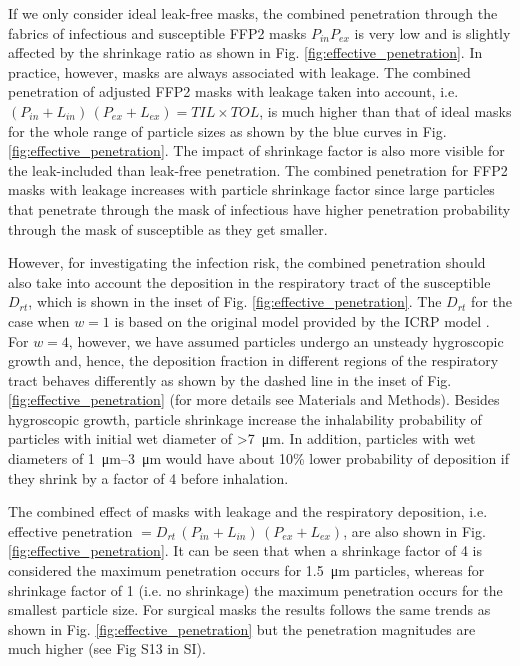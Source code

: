 \documentclass[preprint]{elsarticle}
\begin{document}
If we only consider ideal leak-free masks, the combined penetration through the fabrics of infectious and susceptible FFP2 masks $P_{in} P_{ex}$ is very low and is slightly affected by the shrinkage ratio as shown in Fig. \ref{fig:effective_penetration}. 
In practice, however, masks are always associated with leakage. 
The combined penetration of adjusted FFP2 masks with leakage taken into account, i.e. $\left(P_{in}+L_{in}\right)\,\left(P_{ex}+L_{ex}\right) = TIL\times TOL$, is much higher than that of ideal masks for the whole range of particle sizes as shown by the blue curves in Fig. \ref{fig:effective_penetration}.
The impact of shrinkage factor is also more visible for the leak-included than leak-free penetration.
The combined penetration for FFP2 masks with leakage increases with particle shrinkage factor since large particles that penetrate through the mask of infectious have higher penetration probability through the mask of susceptible as they get smaller. 


However, for investigating the infection risk, the combined penetration should also take into account the deposition in the respiratory tract of the susceptible $D_{rt}$, which is shown in the inset of Fig. \ref{fig:effective_penetration}.
The $D_{rt}$ for the case when $w=1$ is based on the original model provided by the ICRP model \cite{ICRP1994}. 
For $w=4$, however, we have assumed particles undergo an unsteady hygroscopic growth and, hence, the deposition fraction in different regions of the respiratory tract behaves differently as shown by the dashed line in the inset of Fig. \ref{fig:effective_penetration} (for more details see Materials and Methods). 
Besides hygroscopic growth, particle shrinkage increase the inhalability probability of particles with initial wet diameter of \textgreater \SI{7}{\micro\meter}.
In addition, particles with wet diameters of \SIrange[]{1}{3}{\micro\meter} would have about 10\% lower probability of deposition if they shrink by a factor of 4 before inhalation. 

The combined effect of masks with leakage and the respiratory deposition, i.e.
effective penetration $=D_{rt}\,\left(P_{in}+L_{in}\right)\,\left(P_{ex}+L_{ex}\right)$, are also shown in Fig. \ref{fig:effective_penetration}. 
It can be seen that when a shrinkage factor of 4 is considered the maximum penetration occurs for \SI{1.5}{\micro\meter} particles, whereas for shrinkage factor of 1 (i.e. no shrinkage) the maximum penetration occurs for the smallest particle size. 
For surgical masks the results follows the same trends as shown in Fig. \ref{fig:effective_penetration} but the penetration magnitudes are much higher (see Fig S13 in SI).
\end{document}
